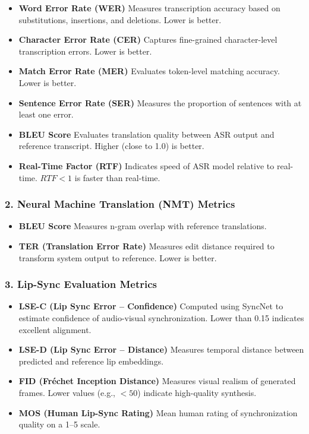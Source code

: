 \documentclass[12pt,oneside]{report}
\begin{document}
\begin{itemize}
    \item \textbf{Word Error Rate (WER)}  
    Measures transcription accuracy based on substitutions, insertions, and deletions.  
    Lower is better.
    \item \textbf{Character Error Rate (CER)}  
    Captures fine-grained character-level transcription errors.  
    Lower is better.
    \item \textbf{Match Error Rate (MER)}  
    Evaluates token-level matching accuracy.  
    Lower is better.
    \item \textbf{Sentence Error Rate (SER)}  
    Measures the proportion of sentences with at least one error.
    \item \textbf{BLEU Score}  
    Evaluates translation quality between ASR output and reference transcript.  
    Higher (close to 1.0) is better.
    \item \textbf{Real-Time Factor (RTF)}  
    Indicates speed of ASR model relative to real-time.  
    $RTF < 1$ is faster than real-time.
\end{itemize}

\subsubsection*{2. Neural Machine Translation (NMT) Metrics}

\begin{itemize}
    \item \textbf{BLEU Score}  
    Measures n-gram overlap with reference translations.
    \item \textbf{TER (Translation Error Rate)}  
    Measures edit distance required to transform system output to reference.  
    Lower is better.
\end{itemize}

\subsubsection*{3. Lip-Sync Evaluation Metrics}

\begin{itemize}
    \item \textbf{LSE-C (Lip Sync Error – Confidence)}  
    Computed using SyncNet to estimate confidence of audio-visual synchronization.  
    Lower than 0.15 indicates excellent alignment.
    \item \textbf{LSE-D (Lip Sync Error – Distance)}  
    Measures temporal distance between predicted and reference lip embeddings.
    \item \textbf{FID (Fréchet Inception Distance)}  
    Measures visual realism of generated frames.  
    Lower values (e.g., $<50$) indicate high-quality synthesis.
    \item \textbf{MOS (Human Lip-Sync Rating)}  
    Mean human rating of synchronization quality on a 1–5 scale.
\end{itemize}
\end{document}
